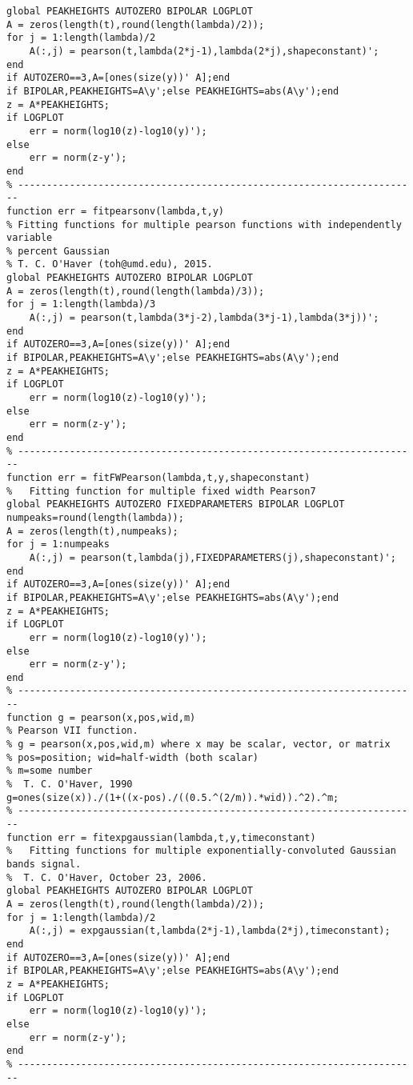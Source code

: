 \begin{lstlisting}
global PEAKHEIGHTS AUTOZERO BIPOLAR LOGPLOT
A = zeros(length(t),round(length(lambda)/2));
for j = 1:length(lambda)/2
    A(:,j) = pearson(t,lambda(2*j-1),lambda(2*j),shapeconstant)';
end
if AUTOZERO==3,A=[ones(size(y))' A];end
if BIPOLAR,PEAKHEIGHTS=A\y';else PEAKHEIGHTS=abs(A\y');end
z = A*PEAKHEIGHTS;
if LOGPLOT
    err = norm(log10(z)-log10(y)');
else
    err = norm(z-y');
end
% ----------------------------------------------------------------------
function err = fitpearsonv(lambda,t,y)
% Fitting functions for multiple pearson functions with independently variable
% percent Gaussian
% T. C. O'Haver (toh@umd.edu), 2015.
global PEAKHEIGHTS AUTOZERO BIPOLAR LOGPLOT
A = zeros(length(t),round(length(lambda)/3));
for j = 1:length(lambda)/3
    A(:,j) = pearson(t,lambda(3*j-2),lambda(3*j-1),lambda(3*j))';
end
if AUTOZERO==3,A=[ones(size(y))' A];end
if BIPOLAR,PEAKHEIGHTS=A\y';else PEAKHEIGHTS=abs(A\y');end
z = A*PEAKHEIGHTS;
if LOGPLOT
    err = norm(log10(z)-log10(y)');
else
    err = norm(z-y');
end
% ----------------------------------------------------------------------
function err = fitFWPearson(lambda,t,y,shapeconstant)
%	Fitting function for multiple fixed width Pearson7
global PEAKHEIGHTS AUTOZERO FIXEDPARAMETERS BIPOLAR LOGPLOT
numpeaks=round(length(lambda));
A = zeros(length(t),numpeaks);
for j = 1:numpeaks
    A(:,j) = pearson(t,lambda(j),FIXEDPARAMETERS(j),shapeconstant)';
end
if AUTOZERO==3,A=[ones(size(y))' A];end
if BIPOLAR,PEAKHEIGHTS=A\y';else PEAKHEIGHTS=abs(A\y');end
z = A*PEAKHEIGHTS;
if LOGPLOT
    err = norm(log10(z)-log10(y)');
else
    err = norm(z-y');
end
% ----------------------------------------------------------------------
function g = pearson(x,pos,wid,m)
% Pearson VII function. 
% g = pearson(x,pos,wid,m) where x may be scalar, vector, or matrix
% pos=position; wid=half-width (both scalar)
% m=some number
%  T. C. O'Haver, 1990  
g=ones(size(x))./(1+((x-pos)./((0.5.^(2/m)).*wid)).^2).^m;
% ----------------------------------------------------------------------
function err = fitexpgaussian(lambda,t,y,timeconstant)
%   Fitting functions for multiple exponentially-convoluted Gaussian bands signal.
%  T. C. O'Haver, October 23, 2006.
global PEAKHEIGHTS AUTOZERO BIPOLAR LOGPLOT
A = zeros(length(t),round(length(lambda)/2));
for j = 1:length(lambda)/2
    A(:,j) = expgaussian(t,lambda(2*j-1),lambda(2*j),timeconstant);
end
if AUTOZERO==3,A=[ones(size(y))' A];end
if BIPOLAR,PEAKHEIGHTS=A\y';else PEAKHEIGHTS=abs(A\y');end
z = A*PEAKHEIGHTS;
if LOGPLOT
    err = norm(log10(z)-log10(y)');
else
    err = norm(z-y');
end
% ----------------------------------------------------------------------

\end{lstlisting}
